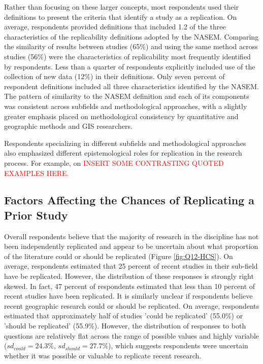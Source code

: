 \documentclass[]{interact}
\theoremstyle{plain}%
\theoremstyle{definition}
\theoremstyle{remark}
\begin{document}
Rather than focusing on these larger concepts, most respondents used their definitions to present the criteria that identify a study as a replication.
On average, respondents provided definitions that included 1.2 of the three characteristics of the replicability definitions adopted by the NASEM.
Comparing the similarity of results between studies (65\%) and using the same method across studies (56\%) were the characteristics of replicability most frequently identified by respondents.
Less than a quarter of respondents explicitly included use of the collection of new data (12\%) in their definitions.
Only seven percent of respondent definitions included all three characteristics identified by the NASEM.
The pattern of similarity to the NASEM definition and each of its components was consistent across subfields and methodological approaches, with a slightly greater emphasis placed on methodological consistency by quantitative and geographic methods and GIS researchers.

Respondents specializing in different subfields and methodological approaches also emphasized different epistemological roles for replication in the research process.
For example, on \textcolor{red}{INSERT SOME CONTRASTING QUOTED EXAMPLES HERE.}

\subsection*{Factors Affecting the Chances of Replicating a Prior Study}
Overall respondents believe that the majority of research in the discipline has not been independently replicated and appear to be uncertain about what proportion of the literature could or should be replicated (Figure \ref{fig:Q12-HCS}). 
On average, respondents estimated that 25 percent of recent studies in their sub-field have be replicated. 
However, the distribution of these responses is strongly right skewed.
In fact, 47 percent of respondents estimated that less than 10 percent of recent studies have been replicated.
It is similarly unclear if respondents believe recent geographic research could or should be replicated.
On average, respondents estimated that approximately half of studies 'could be replicated' (55.0\%) or 'should be replicated' (55.9\%). However, the distribution of responses to both questions are relatively flat across the range of possible values and highly variable (\textit{$sd_{could}=24.3\%$}, \textit{$sd_{should}=27.7\%$}), which suggests 
respondents were uncertain whether it was possible or valuable to replicate recent research.  
\end{document}
